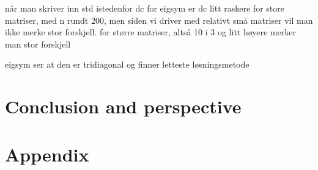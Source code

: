 \documentclass{article}
\begin{document}
  når man skriver inn std istedenfor dc for eigsym er dc litt raskere for store matriser, med n rundt 200, men siden vi driver med relativt små matriser vil man ikke merke stor forskjell. for større matriser, altså 10 i 3 og litt høyere merker man stor forskjell

  eigsym ser at den er tridiagonal og finner letteste løsningsmetode


\vspace{3cm}

\vspace{1cm}

\section{Conclusion and perspective} \label{sec:Conclusion}



\vspace{1cm}

\section{Appendix} \label{sec:Appendix}





\vspace{1cm}
\end{document}
